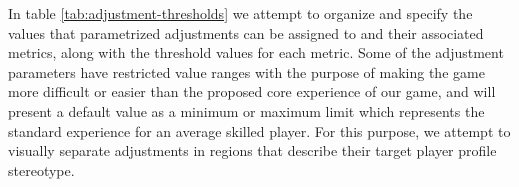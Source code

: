 In table \ref{tab:adjustment-thresholds} we attempt to organize  and specify the values that parametrized adjustments can be assigned to and their associated metrics, along with the threshold values for each metric. Some of the adjustment parameters have restricted value ranges with the purpose of making the game more difficult or easier than the proposed core experience of our game, and will present a default value as a minimum or maximum limit which represents the standard experience for an average skilled player. For this purpose, we attempt to visually separate adjustments in regions that describe their target player profile stereotype.



